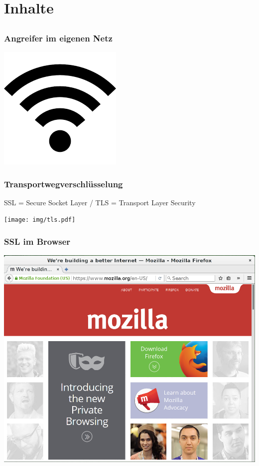 \documentclass[12pt, xcolor={svgnames,table}]{beamer}
\begin{document}
\section{Inhalte}
\subsection{}

\begin{frame}
    \frametitle{Angreifer im eigenen Netz}
    \begin{center}
      \includegraphics[height=0.5\textheight]{img/wifi.png}
    \end{center}
\end{frame}

\begin{frame}
    \frametitle{Transportwegverschlüsselung}
      SSL = Secure Socket Layer / TLS = Transport Layer Security
    \vfill
    \begin{center}
      \texttt{[image: img/tls.pdf]}
    \end{center}
\end{frame}

\begin{frame}
    \frametitle{SSL im Browser}
    \begin{center}
	\includegraphics[height=0.7\textheight]{img/ssl_special.png}
    \end{center}
\end{frame}
\end{document}
